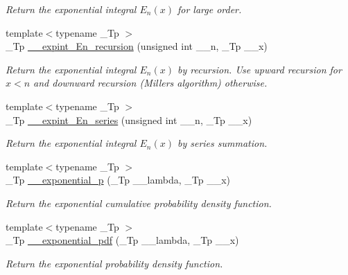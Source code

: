 \begin{DoxyCompactItemize}
\begin{DoxyCompactList}\small\item\em Return the exponential integral $ E_n(x) $ for large order. \end{DoxyCompactList}\item 
{\footnotesize template$<$typename \+\_\+\+Tp $>$ }\\\+\_\+\+Tp \hyperlink{namespacestd_1_1____detail_a9b0a2050324390fb6c4a584170289a99}{\+\_\+\+\_\+expint\+\_\+\+En\+\_\+recursion} (unsigned int \+\_\+\+\_\+n, \+\_\+\+Tp \+\_\+\+\_\+x)
\begin{DoxyCompactList}\small\item\em Return the exponential integral $ E_n(x) $ by recursion. Use upward recursion for $ x < n $ and downward recursion (Miller\textquotesingle{}s algorithm) otherwise. \end{DoxyCompactList}\item 
{\footnotesize template$<$typename \+\_\+\+Tp $>$ }\\\+\_\+\+Tp \hyperlink{namespacestd_1_1____detail_a5c51269e411cd82ffec2e63212f76b41}{\+\_\+\+\_\+expint\+\_\+\+En\+\_\+series} (unsigned int \+\_\+\+\_\+n, \+\_\+\+Tp \+\_\+\+\_\+x)
\begin{DoxyCompactList}\small\item\em Return the exponential integral $ E_n(x) $ by series summation. \end{DoxyCompactList}\item 
{\footnotesize template$<$typename \+\_\+\+Tp $>$ }\\\+\_\+\+Tp \hyperlink{namespacestd_1_1____detail_a0b0c47fc902a5df5bce1ce07eef6ec7b}{\+\_\+\+\_\+exponential\+\_\+p} (\+\_\+\+Tp \+\_\+\+\_\+lambda, \+\_\+\+Tp \+\_\+\+\_\+x)
\begin{DoxyCompactList}\small\item\em Return the exponential cumulative probability density function. \end{DoxyCompactList}\item 
{\footnotesize template$<$typename \+\_\+\+Tp $>$ }\\\+\_\+\+Tp \hyperlink{namespacestd_1_1____detail_add35fd0c4c00f412c0fab7b6018ce2cd}{\+\_\+\+\_\+exponential\+\_\+pdf} (\+\_\+\+Tp \+\_\+\+\_\+lambda, \+\_\+\+Tp \+\_\+\+\_\+x)
\begin{DoxyCompactList}\small\item\em Return the exponential probability density function. \end{DoxyCompactList}\item 

\end{DoxyCompactItemize}

